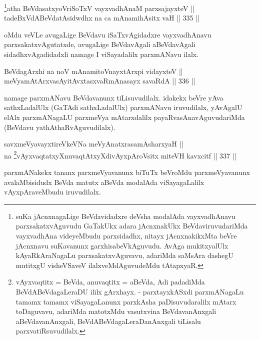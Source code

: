 \begin{shl}
\footnote{suKa jAcnxnagaLige BeVdavidadxre deVsha modalAda
vayxvadhAnavu parxsakatxvAguvudu GaTakUkx adara jAcnxnakUkx
BeVdaviruvudariMda vayxvadhAna videyeMbudu parxsidadhx, nitayx
jAcnxnakikxMta beVre jAcnxnavu suKavanunx garxhisabeVkAguvudu.
AvAga mukitxyalUlx kAyaRkAraNagaLu parxsakatxvAguvavu, adariMda
saMsAra dashegU mutitxgU visheVSaveV ilalxveMdAguvudeMdu tAtapxyaR.}atha BeVdasatxyoVriSoTxV vayxvadhAnaM parxsajayxteV || \\
tadeBxVdABeVdatAsidwdhx na ca mAnamihAsitx vaH \hfill || 335 ||  
\end{shl}

\begin{artha}
oMdu veVLe avugaLige BeVdavu iSaTxvAgidadxre vayxvadhAnavu
parxsakatxvAgutatxde, avugaLige BeVdavAgali aBeVdavAgali
sidadhxvAgadidadxli namage I viSayadalilx parxmANavu ilalx.
\end{artha}

\begin{shl}
BeVdagArxhi na noV mAnamitoV\s nayxtArxpi vidayxteV || \\
meVyamAtArxvasAyitAvxtasxvaRmAnasayx savaRdA \hfill || 336 ||  
\end{shl}

\begin{artha}
namage parxmANavu BeVdavanunx tiLisuvudilalx. idakekx beVre yAva
sathxLadalUlx (GaTAdi sathxLadalUlx) parxmANavu iruvudilalx, yAvAgalU
elAlx parxmANagaLU parxmeVya mAtarxdalilx payaRvasAnavAguvudariMda
(BeVdavu yathAthaRvAguvudilalx).
\end{artha}

\begin{shl}
savxmeVyavayxtireVkeVNa meVyAnatxrasamAsharxyaH || \\
na \footnote{vAyxvaqtitx = BeVda, anuvaqtitx = aBeVda, Adi padadiMda
BeVdABeVdagaLeraDU ililx gArxhayx. - parxtayxkASxdi parxmANagaLu
tamamx tamamx viSayagaLanunx parxkAsha paDisuvudaralilx mAtarx
toDaguvavu, adariMda matotxMdu vasutxvina BeVdavanAnxgali
aBeVdavanAnxgali, BeVdABeVdagaLeraDanAnxgali tiLisalu
parxvatiRsuvudilalx.}vAyxvaqtatxyXnuvaqtAtxyXdivAyxpAroV\s sitx miteVH kavxcitf \hfill || 337 ||  
\end{shl}


\begin{artha}
parxmANakekx tananx parxmeVyavanunx biTuTx beVroMdu
parxmeVyavanunx avalaMbisidudx BeVda matutx aBeVda modalAda
viSayagaLalilx vAyxpAraveMbudu iruvudilalx.
\end{artha}

